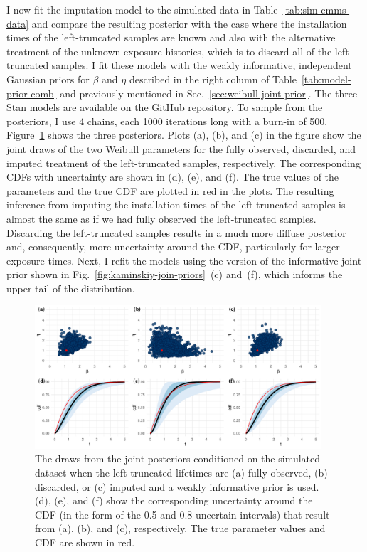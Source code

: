 I now fit the imputation model to the simulated data in Table~\ref{tab:sim-cmms-data} and compare the resulting posterior with the case where the installation times of the left-truncated samples are known and also with the alternative treatment of the unknown exposure histories, which is to discard all of the left-truncated samples. I fit these models with the weakly informative, independent Gaussian priors for $\beta$ and $\eta$ described in the right column of Table~\ref{tab:model-prior-comb} and previously mentioned in Sec.~\ref{sec:weibull-joint-prior}. The three Stan models are available on the GitHub repository. To sample from the posteriors, I use 4 chains, each 1000 iterations long with a burn-in of 500. Figure~\ref{fig:joint-post-weibull} shows the three posteriors. Plots (a), (b), and (c) in the figure show the joint draws of the two Weibull parameters for the fully observed, discarded, and imputed treatment of the left-truncated samples, respectively. The corresponding CDFs with uncertainty are shown in (d), (e), and (f). The true values of the parameters and the true CDF are plotted in red in the plots. The resulting inference from imputing the installation times of the left-truncated samples is almost the same as if we had fully observed the left-truncated samples. Discarding the left-truncated samples results in a much more diffuse posterior and, consequently, more uncertainty around the CDF, particularly for larger exposure times. Next, I refit the models using the version of the informative joint prior shown in Fig.~\ref{fig:kaminskiy-join-priors}~(c) and~(f), which informs the upper tail of the distribution.

\begin{figure}[tbp]
    \centering
    \includegraphics[width=0.95\textwidth]{./figures/ch-2/joint-posts.pdf}
    \caption{The draws from the joint posteriors conditioned on the simulated dataset when the left-truncated lifetimes are (a) fully observed, (b) discarded, or (c) imputed and a weakly informative prior is used. (d), (e), and (f) show the corresponding uncertainty around the CDF (in the form of the 0.5 and 0.8 uncertain intervals) that result from (a), (b), and (c), respectively. The true parameter values and CDF are shown in red.}
    \label{fig:joint-post-weibull}
\end{figure}

